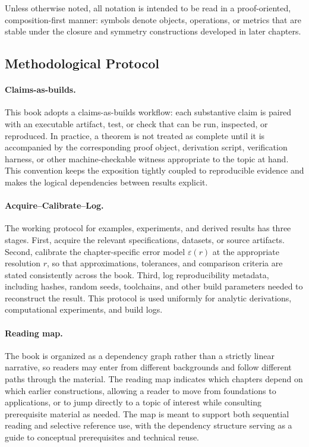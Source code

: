 \documentclass[11pt]{article}
\begin{document}
Unless otherwise noted, all notation is intended to be read in a proof-oriented, composition-first manner: symbols denote objects, operations, or metrics that are stable under the closure and symmetry constructions developed in later chapters.


\subsection{Methodological Protocol}

\paragraph{Claims-as-builds.}
This book adopts a claims-as-builds workflow: each substantive claim is paired with an executable artifact, test, or check that can be run, inspected, or reproduced. In practice, a theorem is not treated as complete until it is accompanied by the corresponding proof object, derivation script, verification harness, or other machine-checkable witness appropriate to the topic at hand. This convention keeps the exposition tightly coupled to reproducible evidence and makes the logical dependencies between results explicit.

\paragraph{Acquire--Calibrate--Log.}
The working protocol for examples, experiments, and derived results has three stages. First, acquire the relevant specifications, datasets, or source artifacts. Second, calibrate the chapter-specific error model \(\varepsilon(r)\) at the appropriate resolution \(r\), so that approximations, tolerances, and comparison criteria are stated consistently across the book. Third, log reproducibility metadata, including hashes, random seeds, toolchains, and other build parameters needed to reconstruct the result. This protocol is used uniformly for analytic derivations, computational experiments, and build logs.

\paragraph{Reading map.}
The book is organized as a dependency graph rather than a strictly linear narrative, so readers may enter from different backgrounds and follow different paths through the material. The reading map indicates which chapters depend on which earlier constructions, allowing a reader to move from foundations to applications, or to jump directly to a topic of interest while consulting prerequisite material as needed. The map is meant to support both sequential reading and selective reference use, with the dependency structure serving as a guide to conceptual prerequisites and technical reuse.
\end{document}

